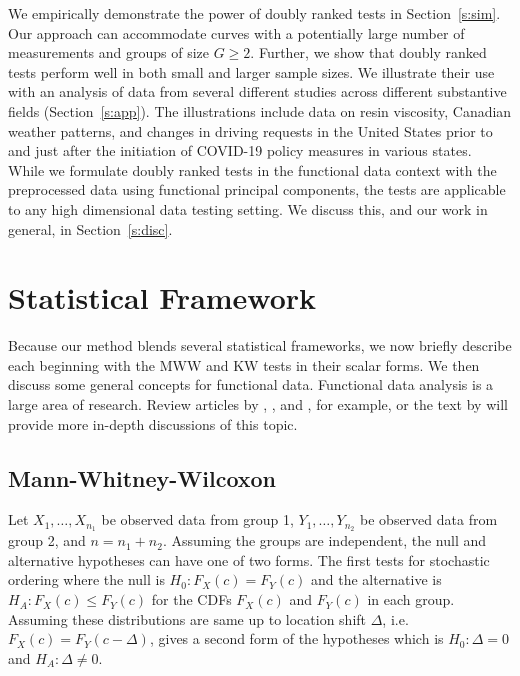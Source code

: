 \documentclass[12pt]{article}
\theoremstyle{plain}
\begin{document}
	We empirically demonstrate the power of doubly ranked tests in Section~\ref{s:sim}. Our approach can accommodate curves with a potentially large number of measurements and groups of size $G \geq 2$. Further, we show that doubly ranked tests perform well in both small and larger sample sizes. We illustrate their use with an analysis of data from several different studies across different substantive fields (Section~\ref{s:app}). The illustrations include data on resin viscosity, Canadian weather patterns, and changes in driving requests in the United States prior to and just after the initiation of COVID-19 policy measures in various states. While we formulate doubly ranked tests in the functional data context with the preprocessed data using functional principal components, the tests are applicable to any high dimensional data testing setting. We discuss this, and our work in general, in Section~\ref{s:disc}.
		
	\section{Statistical Framework}
	\label{s:statframe}

	Because our method blends several statistical frameworks, we now briefly describe each beginning with the MWW and KW tests in their scalar forms. We then discuss some general concepts for functional data. Functional data analysis is a large area of research. Review articles by \cite{Morris2015}, \cite{Wang2016}, and \cite{Greven2017}, for example, or the text by \cite{Ramsay2005} will provide more in-depth discussions of this topic.
	
	\subsection{Mann-Whitney-Wilcoxon}
	
	Let $X_1, \ldots, X_{n_1}$ be observed data from group 1, $Y_1, \ldots, Y_{n_2}$ be observed data from group 2, and $n = n_1 + n_2$. Assuming the groups are independent, the null and alternative hypotheses can have one of two forms. The first tests for stochastic ordering where the null is $H_0: F_X(c) = F_Y(c)$ and the alternative is $H_A: F_X(c) \leq F_Y(c)$ for the CDFs $F_X(c)$ and $F_Y(c)$ in each group. Assuming these distributions are same up to location shift $\Delta$, i.e. $F_X(c) = F_Y(c-\Delta)$, gives a second form of the hypotheses which is $H_0: \Delta = 0$ and $H_A: \Delta \neq 0$. 
	
\end{document}
